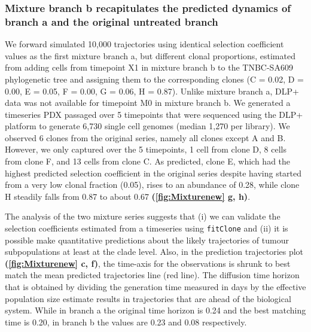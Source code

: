 
\subsubsection{Mixture branch b recapitulates the predicted dynamics of branch a and the original untreated branch}
We forward simulated 10,000 trajectories using identical selection coefficient values as the first mixture branch a, but different clonal proportions, estimated from adding cells from timepoint X1 in mixture branch b to the TNBC-SA609 phylogenetic tree and assigning them to the corresponding clones (C = 0.02, D = 0.00, E = 0.05, F = 0.00, G = 0.06, H = 0.87). Unlike mixture branch a, DLP+ data was not available for timepoint M0 in mixture branch b. We generated a timeseries PDX passaged over 5 timepoints that were sequenced using the DLP+ platform to generate 6,730 single cell genomes (median 1,270 per library). We observed 6 clones from the original series, namely all clones except A and B. However, we only captured over the 5 timepoints, 1 cell from clone D, 8 cells from clone F, and 13 cells from clone C. As predicted, clone E, which had the highest predicted selection coefficient in the original series despite having started from a very low clonal fraction (0.05), rises to an abundance of 0.28, while clone H steadily falls from 0.87 to about 0.67 \textbf{(\autoref{fig:Mixturenew} g, h)}.

The analysis of the two mixture series suggests that (i) we can validate the selection coefficients estimated from a timeseries using \texttt{fitClone} and (ii) it is possible make quantitative predictions about the likely trajectories of tumour subpopulations at least at the clade level. Also, in the prediction trajectories plot \textbf{(\autoref{fig:Mixturenew} c, f)}, the time-axis for the observations is shrunk to best match the mean predicted trajectories line (red line). The diffusion time horizon that is obtained by dividing the generation time measured in days by the effective population size estimate results in trajectories that are ahead of the biological system. While in branch a the original time horizon is 0.24 and the best matching time is 0.20, in branch b the values are 0.23 and 0.08 respectively.


